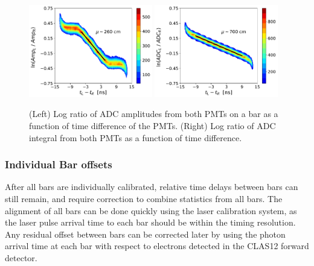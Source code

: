 \documentclass[3p,final,twocolumn]{elsarticle}
\begin{document}
\begin{figure}[tb]
	\centering
		\includegraphics[width=0.48\textwidth]{atten-amp.pdf}
		\includegraphics[width=0.48\textwidth]{atten-adc.pdf}
	\caption{(Left) Log ratio of ADC amplitudes from both PMTs on a bar as a function of time difference of the PMTs. (Right) Log ratio of ADC integral from both PMTs as a function of time difference.}
	\label{fig:atten}
\end{figure}

\subsubsection{Individual Bar offsets}
After all bars are individually calibrated, relative time delays between bars can still remain, and require correction to combine 
statistics from all bars. The alignment of all bars can be done quickly using the laser calibration system, as the laser pulse arrival 
time to each bar should be within the timing resolution. Any residual offset 
between bars can be corrected later by using the photon arrival time
at each bar with respect to electrons detected in the CLAS12 forward
detector. 
\end{document}
